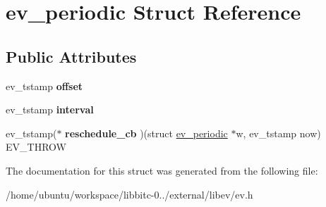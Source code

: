 \hypertarget{structev__periodic}{\section{ev\-\_\-periodic Struct Reference}
\label{structev__periodic}
}
\subsection*{Public Attributes}
\begin{DoxyCompactItemize}
\item 
\hypertarget{structev__periodic_ae7fca8b8ce6fbccc41372d7bf12813e6}{ev\-\_\-tstamp {\bfseries offset}}\label{structev__periodic_ae7fca8b8ce6fbccc41372d7bf12813e6}

\item 
\hypertarget{structev__periodic_a84e353461763d37229b4a7028ed852aa}{ev\-\_\-tstamp {\bfseries interval}}\label{structev__periodic_a84e353461763d37229b4a7028ed852aa}

\item 
\hypertarget{structev__periodic_a7568f25ac430a190e0325f320fa1adc2}{ev\-\_\-tstamp($\ast$ {\bfseries reschedule\-\_\-cb} )(struct \hyperlink{structev__periodic}{ev\-\_\-periodic} $\ast$w, ev\-\_\-tstamp now) E\-V\-\_\-\-T\-H\-R\-O\-W}\label{structev__periodic_a7568f25ac430a190e0325f320fa1adc2}

\end{DoxyCompactItemize}


The documentation for this struct was generated from the following file\-:\begin{DoxyCompactItemize}
\item 
/home/ubuntu/workspace/libbitc-\/0../external/libev/ev.\-h\end{DoxyCompactItemize}
